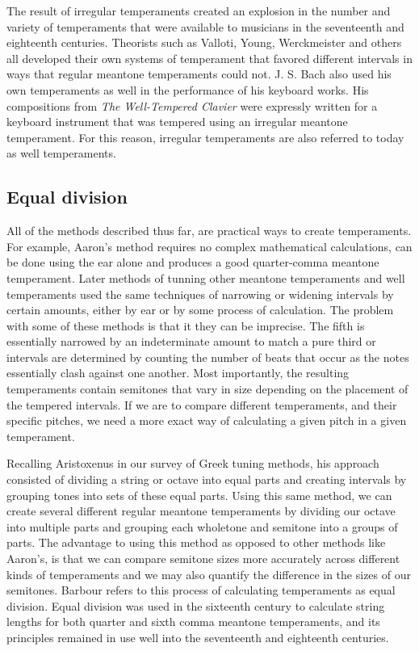 The result of irregular temperaments created an explosion in the number and variety of
temperaments that were available to musicians in the seventeenth and eighteenth centuries.
Theorists such as Valloti, Young, Werckmeister and others all developed their own systems
of temperament that favored different intervals in ways that regular meantone temperaments
could not.  J. S. Bach also used his own temperaments as well in the performance of his
keyboard works.  His compositions from \textit{The Well-Tempered Clavier} were expressly
written for a keyboard instrument that was tempered using an irregular meantone
temperament. For this reason, irregular temperaments are also referred to today as well
temperaments.

\subsection{Equal division}

All of the methods described thus far, are practical ways to create temperaments.
For example, Aaron's method requires no complex mathematical calculations, can be done
using the ear alone and produces a good quarter-comma meantone temperament.  Later methods
of tunning other meantone temperaments and well temperaments used the same techniques of
narrowing or widening intervals by certain amounts, either by ear or by some process of
calculation. The problem with some of these methods is that it they can be imprecise. The
fifth is essentially narrowed by an indeterminate amount to match a pure third or
intervals are determined by counting the number of beats that occur as the notes
essentially clash against one another.  Most importantly, the resulting temperaments
contain semitones that vary in size depending on the placement of the tempered intervals.
If we are to compare different temperaments, and their specific pitches, we need a more
exact way of calculating a given pitch in a given temperament.

Recalling Aristoxenus in our survey of Greek tuning methods, his approach consisted of
dividing a string or octave into equal parts and creating intervals by grouping tones into
sets of these equal parts. Using this same method, we can create several different regular
meantone temperaments by dividing our octave into multiple parts and grouping each
wholetone and semitone into a groups of parts. The advantage to using this method as
opposed to other methods like Aaron's, is that we can compare semitone sizes more
accurately across different kinds of temperaments and we may also quantify the difference
in the sizes of our semitones. Barbour refers to this process of calculating temperaments
as equal division. Equal division was used in the sixteenth century to calculate string
lengths for both quarter and sixth comma meantone temperaments, and its principles
remained in use well into the seventeenth and eighteenth centuries.

